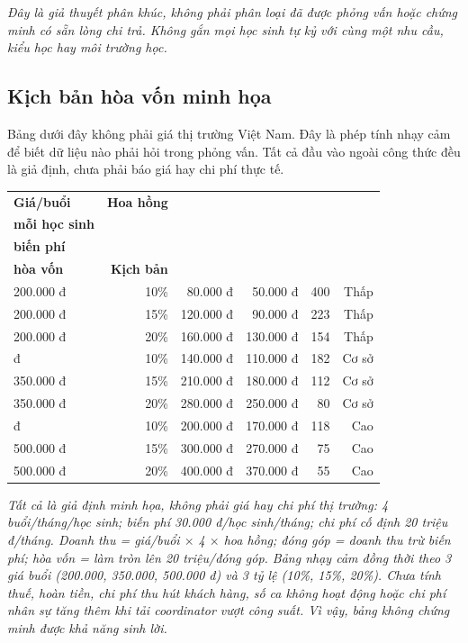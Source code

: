 \documentclass[11pt,a4paper]{article}
\begin{document}
\textit{Đây là giả thuyết phân khúc, không phải phân loại đã được phỏng vấn
hoặc chứng minh có sẵn lòng chi trả. Không gắn mọi học sinh tự kỷ với cùng một
nhu cầu, kiểu học hay môi trường học.}

\subsection{Kịch bản hòa vốn minh họa}

Bảng dưới đây không phải giá thị trường Việt Nam. Đây là phép tính nhạy cảm để
biết dữ liệu nào phải hỏi trong phỏng vấn. Tất cả đầu vào ngoài công thức đều
là giả định, chưa phải báo giá hay chi phí thực tế.

\begin{center}
\small
\begin{tabular}{p{2.25cm}rrrrr}
\toprule
\textbf{Giá/buổi} & \textbf{Hoa hồng} &
\shortstack{\textbf{Doanh thu/tháng}\\\textbf{mỗi học sinh}} &
\shortstack{\textbf{Đóng góp sau}\\\textbf{biến phí}} &
\shortstack{\textbf{Số học sinh}\\\textbf{hòa vốn}} &
\textbf{Kịch bản}\\
\midrule
200.000 đ & 10\% & 80.000 đ & 50.000 đ & 400 & Thấp \\
200.000 đ & 15\% & 120.000 đ & 90.000 đ & 223 & Thấp \\
200.000 đ & 20\% & 160.000 đ & 130.000 đ & 154 & Thấp \\
\addlinespace
350.000 đ & 10\% & 140.000 đ & 110.000 đ & 182 & Cơ sở \\
350.000 đ & 15\% & 210.000 đ & 180.000 đ & 112 & Cơ sở \\
350.000 đ & 20\% & 280.000 đ & 250.000 đ & 80 & Cơ sở \\
\addlinespace
500.000 đ & 10\% & 200.000 đ & 170.000 đ & 118 & Cao \\
500.000 đ & 15\% & 300.000 đ & 270.000 đ & 75 & Cao \\
500.000 đ & 20\% & 400.000 đ & 370.000 đ & 55 & Cao \\
\bottomrule
\end{tabular}
\normalsize
\end{center}

\small
\textit{Tất cả là giả định minh họa, không phải giá hay chi phí thị trường:
4 buổi/tháng/học sinh; biến phí 30.000 đ/học sinh/tháng; chi phí cố định
20 triệu đ/tháng. Doanh thu = giá/buổi $\times$ 4 $\times$ hoa hồng;
đóng góp = doanh thu trừ biến phí; hòa vốn = làm tròn lên
20 triệu/đóng góp. Bảng nhạy cảm đồng thời theo 3 giá buổi (200.000,
350.000, 500.000 đ) và 3 tỷ lệ (10\%, 15\%, 20\%). Chưa tính thuế, hoàn
tiền, chi phí thu hút khách hàng, số ca không hoạt động hoặc chi phí nhân sự
tăng thêm khi tải coordinator vượt công suất. Vì vậy, bảng không chứng minh
được khả năng sinh lời.}
\normalsize
\end{document}
